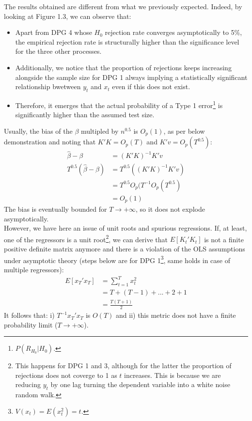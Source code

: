 \documentclass[]{article}
\begin{document}
The results obtained are different from what we previously expected. Indeed, by looking at Figure 1.3, we can observe that:
\begin{itemize}
	\item Apart from DPG 4 whose $H_0$ rejection rate converges asymptotically to 5\%, the empirical rejection rate is structurally higher than the significance level for the three other processes.
	\item Additionally, we notice that the proportion of rejections keeps increasing alongside the sample size for DPG 1 always implying a statistically significant relationship bwetween $y_t$ and $x_t$ even if this does not exist.
	\item Therefore, it emerges that the actual probability of a Type 1 error\footnote{$P(R_{H_0}|H_0)$.} is significantly higher than the assumed test size.
\end{itemize}
Usually, the bias of the $\beta$ multipled by $n^{0.5}$ is $O_{p}(1)$, as per below demonstration and noting that $K'K = O_{p}(T)$ and $K'v = O_{p}(T^{0.5})$:
\begin{align*}
	\hat{\beta} - \beta &= (K'K)^{-1}K'v \\
	T^{0.5}(\hat{\beta} - \beta) &= T^{0.5}((K'K)^{-1}K'v) \\
	&= T^{0.5}O_{p}(T^{-1}O_{p}(T^{0.5}) \\
	&= O_{p}(1)  
\end{align*}
The bias is eventually bounded for $T \to +\infty$, so it does not explode asymptotically.\\ 
However, we have here an issue of unit roots and spurious regressions. If, at least, one of the regressors is a unit root\footnote{This happens for DPG 1 and 3, although for the latter the proportion of rejections does not coverge to 1 as $t$ increases. This is because we are reducing $y_t$ by one lag turning the dependent variable into a white noise random walk.}, we can derive that $E[K_{t}'K_{t}]$ is not a finite positive definite matrix anymore and there is a violation of the OLS assumptions under asymptotic theory (steps below are for DPG 1\footnote{$V(x_t) = E(x_{t}^2) = t$.}, same holds in case of multiple regressors):
\begin{align*}
	E[x_{T}'x_{T}] &= \sum_{t=1}^{T}x_{t}^2 \\  
	&= T + (T-1) +...+2+1 \\
	&= \frac{T(T+1)}{2}
\end{align*}
It follows that: i) $T^{-1}x_{T}'x_{T}$ is $O(T)$ and ii) this metric does not have a finite probability limit ($T \to + \infty$). \\
\end{document}
